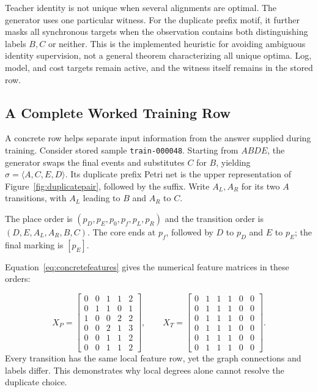 Teacher identity is not unique when several alignments are optimal. The generator uses one particular witness. For the duplicate prefix motif, it further masks all synchronous targets when the observation contains both distinguishing labels $B,C$ or neither. This is the implemented heuristic for avoiding ambiguous identity supervision, not a general theorem characterizing all unique optima. Log, model, and cost targets remain active, and the witness itself remains in the stored row.

\subsection{A Complete Worked Training Row}
\label{sec:trainingrow}

A concrete row helps separate input information from the answer supplied during training. Consider stored sample \texttt{train-000048}. Starting from $ABDE$, the generator swaps the final events and substitutes $C$ for $B$, yielding $\sigma=\langle A,C,E,D\rangle$. Its duplicate prefix Petri net is the upper representation of Figure~\ref{fig:duplicatepair}, followed by the suffix. Write $A_L,A_R$ for its two $A$ transitions, with $A_L$ leading to $B$ and $A_R$ to $C$.

The place order is $(p_D,p_E,p_0,p_f,p_L,p_R)$ and the transition order is $(D,E,A_L,A_R,B,C)$. The core ends at $p_f$, followed by $D$ to $p_D$ and $E$ to $p_E$; the final marking is $[p_E]$. \begin{revised}Equation~\eqref{eq:concretefeatures} gives the numerical feature matrices in these orders:\end{revised}
\begin{equation}
 X_P=\begin{bmatrix}
 0&0&1&1&2\\0&1&1&0&1\\1&0&0&2&2\\
 0&0&2&1&3\\0&0&1&1&2\\0&0&1&1&2
 \end{bmatrix},\qquad
 X_T=\begin{bmatrix}
 0&1&1&1&0&0\\0&1&1&1&0&0\\0&1&1&1&0&0\\
 0&1&1&1&0&0\\0&1&1&1&0&0\\0&1&1&1&0&0
 \end{bmatrix}.
 \label{eq:concretefeatures}
\end{equation}
Every transition has the same local feature row, yet the graph connections and labels differ. This demonstrates why local degrees alone cannot resolve the duplicate choice.

